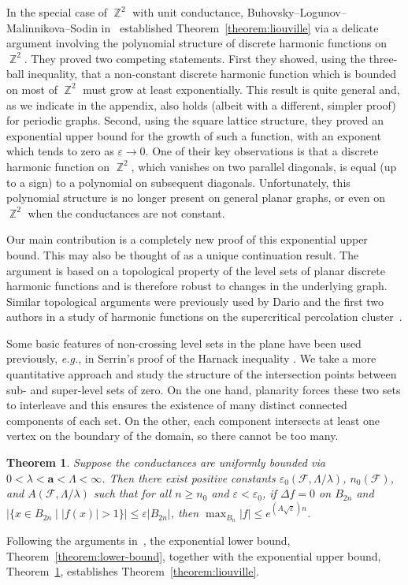 \documentclass{daj}
\newtheorem{theorem}{Theorem}[section]
\newcommand{\cond}{\mathbf{a}}
\newcommand{\eps}{\varepsilon}
\DeclareMathOperator{\Z}{\mathbb{Z}}
\newcommand{\eg}{{\it e.g.}}
\begin{document}
In the special case of $\Z^2$ with unit conductance, Buhovsky--Logunov--Malinnikova--Sodin in~\cite{buhovsky2022discrete}
established Theorem~\ref{theorem:liouville} via a delicate argument involving the polynomial structure of discrete harmonic functions on $\Z^2$. They proved two competing statements. First they showed, using the three-ball inequality, that a non-constant discrete harmonic function which is bounded on most of $\Z^2$ must grow at least exponentially. This result is quite general and, as we indicate in the appendix, also holds (albeit with a different, simpler proof) for periodic graphs. Second, using the square lattice structure, they proved an exponential upper bound for the growth of such a function, with an exponent which tends to zero as $\eps \to 0$.  One of their key observations is that a discrete harmonic function on $\Z^2$, which vanishes on two parallel diagonals, is equal (up to a sign) to a polynomial on subsequent diagonals. Unfortunately, this polynomial structure is no longer present on general planar graphs, or even on $\Z^2$ when the conductances are not constant.

Our main contribution is a completely new proof of this exponential upper bound. This may also be thought of as a unique continuation result. The argument is based on a topological property of the level sets of planar discrete harmonic functions and is therefore robust to changes in the underlying graph. Similar topological arguments were previously used by Dario and the first two authors in a study of harmonic functions on the supercritical percolation cluster~\cite{bou2023rigidity}.

Some basic features of non-crossing level sets in the plane have been used previously, \eg, in Serrin's proof of the Harnack inequality \cite{MR0081415}. We take a more quantitative approach and study the structure of the intersection points between sub- and super-level sets of zero. On the one hand, planarity forces these two sets to interleave and this ensures the existence of many distinct connected components of each set. On the other, each component intersects at least one vertex on the boundary of the domain, so there cannot be too many.
\begin{theorem}\label{theorem:uniformly-bounded}
	Suppose the conductances are uniformly bounded via $0 < \lambda < \cond < \Lambda < \infty$.
	Then there exist positive constants $\eps_0(\mathcal{F}, \Lambda/\lambda)$, $n_0(\mathcal{F})$, and $A(\mathcal{F}, \Lambda/\lambda)$
	such that for all $n \geq n_0$ and $\eps < \eps_0$,
	if $\Delta f = 0$ on $B_{2 n}$
	and $|\{x \in B_{2n} \mid  |f(x)| > 1\}| \leq \eps |B_{2n}|$, then $\max_{B_{n}} |f| \leq e^{(A \sqrt{\eps}) n} $.
\end{theorem}
Following the arguments in~\cite{buhovsky2022discrete}, the exponential lower bound, Theorem~\ref{theorem:lower-bound}, together with the exponential upper bound, Theorem~\ref{theorem:uniformly-bounded}, establishes Theorem~\ref{theorem:liouville}.
\end{document}

